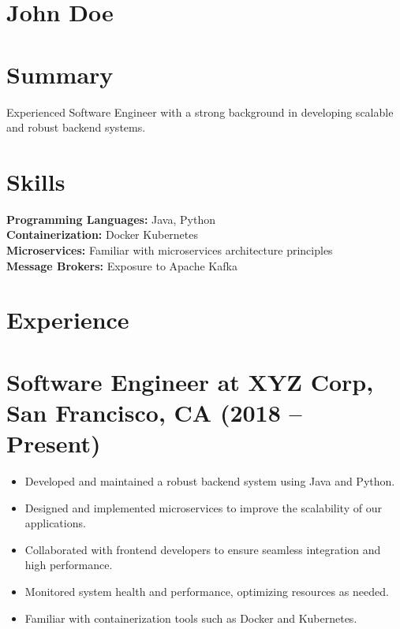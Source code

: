 \documentclass[11pt]{article}
\begin{document}
\section*{John Doe}

\vspace{-0.5em}
\section*{Summary}
Experienced Software Engineer with a strong background in developing scalable and robust backend systems.

\vspace{1em}
\section*{Skills}
\textbf{Programming Languages:} Java, Python \\
\textbf{Containerization:} Docker \underline{\hspace{0.5cm}} Kubernetes \\
\textbf{Microservices:} Familiar with microservices architecture principles \\
\textbf{Message Brokers:} Exposure to Apache Kafka

\vspace{1em}
\section*{Experience}

\section*{Software Engineer at XYZ Corp, San Francisco, CA (2018 -- Present)}
\begin{itemize}[left=0pt]
  \item Developed and maintained a robust backend system using Java and Python.
  \item Designed and implemented microservices to improve the scalability of our applications.
  \item Collaborated with frontend developers to ensure seamless integration and high performance.
  \item Monitored system health and performance, optimizing resources as needed.
  \item Familiar with containerization tools such as Docker and Kubernetes.
\end{itemize}

\vspace{-0.5em}
\end{document}
